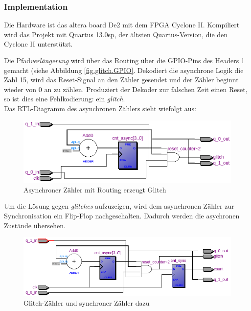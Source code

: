 \subsubsection{Implementation} 
Die Hardware ist das altera board De2 mit dem FPGA Cyclone II. Kompiliert wird das Projekt mit Quartus 13.0sp, der ältsten Quartus-Version, die den Cyclone II unterstützt.

Die Pfad\textit{verlängerung} wird über das Routing über die GPIO-Pins des Headers 1 gemacht (siehe Abbildung \ref{fig.glitch.GPIO}. Dekodiert die asynchrone Logik die Zahl 15, wird das  Reset-Signal an den Zähler gesendet und der Zähler beginnt wieder von 0 an zu zählen. Produziert der Dekoder zur falschen Zeit einen Reset, so ist dies eine Fehlkodierung: ein \textit{glitch}.\\

Das RTL-Diagramm des asynchronen Zählers sieht wiefolgt aus:
\begin{figure}[H]
	\includegraphics[width=1\textwidth]{images/glitch/RTL_asynchron.png}
	\caption{Asynchroner Zähler mit Routing erzeugt Glitch}
	\label{fig.glitch.RTL_nurGlitch}
\end{figure}

Um die Lösung gegen \textit{glitches} aufzuzeigen, wird dem asynchronen Zähler zur Synchronisation ein Flip-Flop nachgeschalten. Dadurch werden die asychronen Zustände übersehen. 
\begin{figure}[H]
	\includegraphics[width=\textwidth]{images/glitch/glitch_asynch_new.png}
	\caption{Glitch-Zähler und synchroner Zähler dazu}
	\label{fig.glitch.RTL_mit_synchr.Zaehler}
\end{figure}

